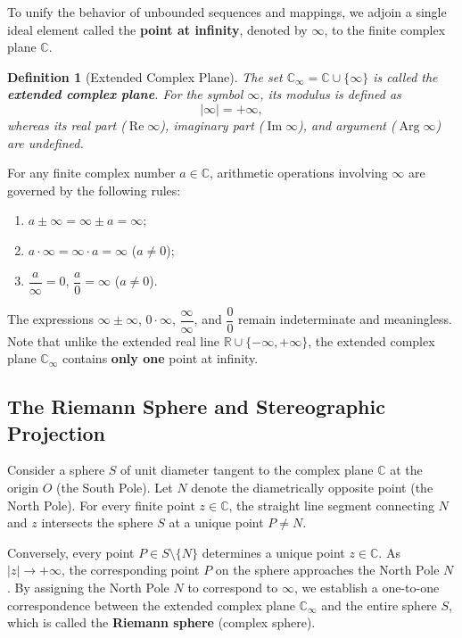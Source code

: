 \documentclass[11pt,a4paper]{article}
\theoremstyle{definitionbreak}
\newtheorem{definition}{Definition}
\theoremstyle{examplebreak}
\theoremstyle{plain}
\begin{document}
To unify the behavior of unbounded sequences and mappings, we adjoin a single ideal element called the \textbf{point at infinity}, denoted by $\infty$, to the finite complex plane $\mathbb{C}$.

\begin{definition}[Extended Complex Plane]
The set $\mathbb{C}_\infty = \mathbb{C} \cup \{\infty\}$ is called the \textbf{extended complex plane}. For the symbol $\infty$, its modulus is defined as
\[
    |\infty| = +\infty,
\]
whereas its real part ($\operatorname{Re}\infty$), imaginary part ($\operatorname{Im}\infty$), and argument ($\operatorname{Arg}\infty$) are undefined.
\end{definition}

For any finite complex number $a \in \mathbb{C}$, arithmetic operations involving $\infty$ are governed by the following rules:
\begin{enumerate}
    \item $a \pm \infty = \infty \pm a = \infty$;
    \item $a \cdot \infty = \infty \cdot a = \infty$ \quad ($a \neq 0$);
    \item $\dfrac{a}{\infty} = 0$, \quad $\dfrac{a}{0} = \infty$ \quad ($a \neq 0$).
\end{enumerate}
The expressions $\infty \pm \infty$, $0 \cdot \infty$, $\dfrac{\infty}{\infty}$, and $\dfrac{0}{0}$ remain indeterminate and meaningless. Note that unlike the extended real line $\mathbb{R} \cup \{-\infty, +\infty\}$, the extended complex plane $\mathbb{C}_\infty$ contains \textbf{only one} point at infinity.

\subsection{The Riemann Sphere and Stereographic Projection}

Consider a sphere $S$ of unit diameter tangent to the complex plane $\mathbb{C}$ at the origin $O$ (the South Pole). Let $N$ denote the diametrically opposite point (the North Pole). For every finite point $z \in \mathbb{C}$, the straight line segment connecting $N$ and $z$ intersects the sphere $S$ at a unique point $P \neq N$.

Conversely, every point $P \in S \setminus \{N\}$ determines a unique point $z \in \mathbb{C}$. As $|z| \to +\infty$, the corresponding point $P$ on the sphere approaches the North Pole $N$. By assigning the North Pole $N$ to correspond to $\infty$, we establish a one-to-one correspondence between the extended complex plane $\mathbb{C}_\infty$ and the entire sphere $S$, which is called the \textbf{Riemann sphere} (complex sphere).
\end{document}
